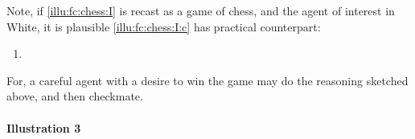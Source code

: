 \begin{note}
  Note, if \autoref{illu:fc:chess:I} is recast as a game of chess, and the agent of interest in White, it is plausible \ref{illu:fc:chess:I:c} has practical counterpart:
  \begin{enumerate}[label=C\thescenarioCounter\('\)., ref=C\thescenarioCounter\('\)]
  \item
    \label{illu:fc:chess:I:c:p}
  \end{enumerate}
  For, a careful agent with a desire to win the game may do the reasoning sketched above, and then checkmate.
\end{note}



\paragraph{Illustration 3}

